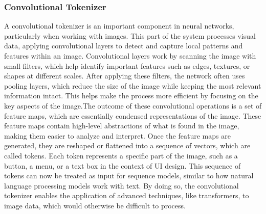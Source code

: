 \subsubsection{Convolutional Tokenizer}
A convolutional tokenizer is an important component in neural networks, particularly when working with images. This part of the system processes visual data, applying convolutional layers to detect and capture local patterns and features within an image. Convolutional layers work by scanning the image with small filters, which help identify important features such as edges, textures, or shapes at different scales. After applying these filters, the network often uses pooling layers, which reduce the size of the image while keeping the most relevant information intact. This helps make the process more efficient by focusing on the key aspects of the image.The outcome of these convolutional operations is a set of feature maps, which are essentially condensed representations of the image. These feature maps contain high-level abstractions of what is found in the image, making them easier to analyze and interpret. Once the feature maps are generated, they are reshaped or flattened into a sequence of vectors, which are called tokens. Each token represents a specific part of the image, such as a button, a menu, or a text box in the context of UI design. This sequence of tokens can now be treated as input for sequence models, similar to how natural language processing models work with text. By doing so, the convolutional tokenizer enables the application of advanced techniques, like transformers, to image data, which would otherwise be difficult to process.

